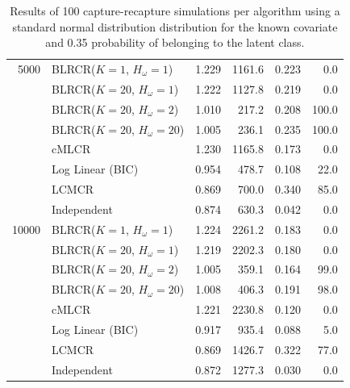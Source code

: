 \documentclass[
  12pt,
]{article}
\begin{document}
\begin{table}[H]
\begin{tabular}{||r l r r r r||}
 5000          & BLRCR($K=1$, $H_\omega=1$)  & 1.229   & 1161.6   & 0.223   & 0.0 \\ 
               & BLRCR($K=20$, $H_\omega=1$)    & 1.222     & 1127.8     & 0.219     & 0.0 \\ 
               & BLRCR($K=20$, $H_\omega=2$)    & 1.010     & 217.2     & 0.208     & 100.0 \\
               & BLRCR($K=20$, $H_\omega=20$)    & 1.005     & 236.1     & 0.235     & 100.0 \\ 
               & cMLCR       & 1.230       & 1165.8      & 0.173      & 0.0 \\
               & Log Linear (BIC)  & 0.954      & 478.7     & 0.108     & 22.0 \\ 
               & LCMCR       & 0.869       & 700.0      & 0.340      & 85.0 \\ 
               & Independent & 0.874 & 630.3& 0.042& 0.0 \\ 

 \hline
 


 10000          & BLRCR($K=1$, $H_\omega=1$)  & 1.224   & 2261.2   & 0.183   & 0.0 \\ 
               & BLRCR($K=20$, $H_\omega=1$)    & 1.219     & 2202.3     & 0.180     & 0.0 \\ 
               & BLRCR($K=20$, $H_\omega=2$)    & 1.005     & 359.1     & 0.164     & 99.0 \\
               & BLRCR($K=20$, $H_\omega=20$)    & 1.008     & 406.3     & 0.191     & 98.0 \\ 
               & cMLCR       & 1.221       & 2230.8      & 0.120      & 0.0 \\
               & Log Linear (BIC)  & 0.917      & 935.4     & 0.088     & 5.0 \\ 
               & LCMCR       & 0.869       & 1426.7      & 0.322      & 77.0 \\ 
               & Independent & 0.872 & 1277.3& 0.030& 0.0 \\ 

 \hline
\end{tabular}
\caption{Results of 100 capture-recapture simulations per algorithm using a standard normal distribution distribution for the known covariate and 0.35 probability of belonging to the latent class.}
\label{table:heterodist}
\end{table}
\end{document}
